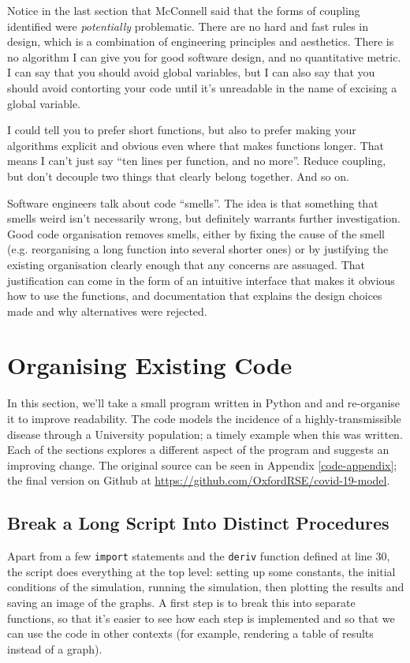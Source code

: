 \documentclass[a4paper]{article}
\begin{document}
Notice in the last section that McConnell said that the forms of coupling identified were \emph{potentially} problematic.
There are no hard and fast rules in design, which is a combination of engineering principles and aesthetics.
There is no algorithm I can give you for good software design, and no quantitative metric.
I can say that you should avoid global variables, but I can also say that you should avoid contorting your code until it's unreadable in the name of excising a global variable.

I could tell you to prefer short functions, but also to prefer making your algorithms explicit and obvious even where that makes functions longer.
That means I can't just say ``ten lines per function, and no more''.
Reduce coupling, but don't decouple two things that clearly belong together.
And so on.

Software engineers talk about code ``smells''\cite{chsmell}.
The idea is that something that smells weird isn't necessarily wrong, but definitely warrants further investigation.
Good code organisation removes smells, either by fixing the cause of the smell (e.g.
reorganising a long function into several shorter ones) or by justifying the existing organisation clearly enough that any concerns are assuaged.
That justification can come in the form of an intuitive interface that makes it obvious how to use the functions, and documentation that explains the design choices made and why alternatives were rejected.

\section{Organising Existing Code}

In this section, we'll take a small program written in Python and and re-organise it to improve readability.
The code models the incidence of a highly-transmissible disease through a University population; a timely example when this was written.
Each of the sections explores a different aspect of the program and suggests an improving change.
The original source can be seen in Appendix \ref{code-appendix}; the final version on Github at \url{https://github.com/OxfordRSE/covid-19-model}.

\subsection{Break a Long Script Into Distinct Procedures\label{breaklong}}

Apart from a few \texttt{import} statements and the \texttt{deriv} function defined at line 30, the script does everything at the top level: setting up some constants, the initial conditions of the simulation, running the simulation, then plotting the results and saving an image of the graphs.
A first step is to break this into separate functions, so that it's easier to see how each step is implemented and so that we can use the code in other contexts (for example, rendering a table of results instead of a graph).
\end{document}
